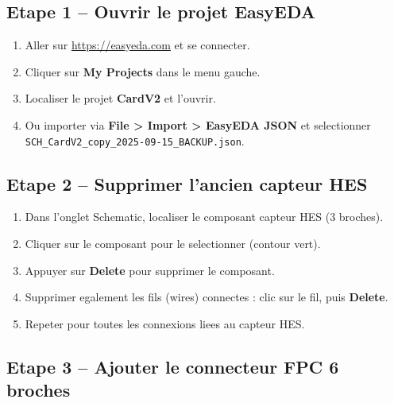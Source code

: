 \documentclass[12pt,a4paper]{article}
\begin{document}
\subsection{Etape 1 -- Ouvrir le projet EasyEDA}

\begin{enumerate}
  \item Aller sur \url{https://easyeda.com} et se connecter.
  \item Cliquer sur \textbf{My Projects} dans le menu gauche.
  \item Localiser le projet \textbf{CardV2} et l'ouvrir.
  \item Ou importer via \textbf{File > Import > EasyEDA JSON} et selectionner
        \texttt{SCH\_CardV2\_copy\_2025-09-15\_BACKUP.json}.
\end{enumerate}

\subsection{Etape 2 -- Supprimer l'ancien capteur HES}

\begin{enumerate}
  \item Dans l'onglet Schematic, localiser le composant capteur HES (3 broches).
  \item Cliquer sur le composant pour le selectionner (contour vert).
  \item Appuyer sur \textbf{Delete} pour supprimer le composant.
  \item Supprimer egalement les fils (wires) connectes : clic sur le fil,
        puis \textbf{Delete}.
  \item Repeter pour toutes les connexions liees au capteur HES.
\end{enumerate}

\subsection{Etape 3 -- Ajouter le connecteur FPC 6 broches}
\end{document}
